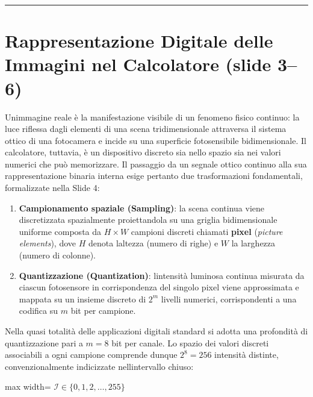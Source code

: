 \documentclass[11pt,a4paper,oneside,openany]{book}
\providecommand{\tightlist}{\setlength{\itemsep}{0pt}\setlength{\parskip}{0pt}}
\begin{document}
\begin{center}\rule{0.5\linewidth}{0.5pt}\end{center}

\section{Rappresentazione Digitale delle Immagini nel Calcolatore (slide 3--6)}\label{f02-r47}

Un\textquotesingle immagine reale è la manifestazione visibile di un fenomeno fisico continuo: la luce riflessa dagli elementi di una scena tridimensionale attraversa il sistema ottico di una fotocamera e incide su una superficie fotosensibile bidimensionale. Il calcolatore, tuttavia, è un dispositivo discreto sia nello spazio sia nei valori numerici che può memorizzare. Il passaggio da un segnale ottico continuo alla sua rappresentazione binaria interna esige pertanto due trasformazioni fondamentali, formalizzate nella Slide 4:

\begin{enumerate}
\def\labelenumi{\arabic{enumi}.}
\tightlist
\item
  \textbf{Campionamento spaziale (Sampling)}: la scena continua viene discretizzata spazialmente proiettandola su una griglia bidimensionale uniforme composta da \(H \times W\) campioni discreti chiamati \textbf{pixel} (\emph{picture elements}), dove \(H\) denota l\textquotesingle altezza (numero di righe) e \(W\) la larghezza (numero di colonne).
\item
  \textbf{Quantizzazione (Quantization)}: l\textquotesingle intensità luminosa continua misurata da ciascun fotosensore in corrispondenza del singolo pixel viene approssimata e mappata su un insieme discreto di \(2^m\) livelli numerici, corrispondenti a una codifica su \(m\) bit per campione.
\end{enumerate}

Nella quasi totalità delle applicazioni digitali standard si adotta una profondità di quantizzazione pari a \(m = 8\) bit per canale. Lo spazio dei valori discreti associabili a ogni campione comprende dunque \(2^8 = 256\) intensità distinte, convenzionalmente indicizzate nell\textquotesingle intervallo chiuso:

\begin{center}
\begin{adjustbox}{max width=\linewidth}
$\displaystyle 
\mathcal{I} \in \{0, 1, 2, \dots, 255\}
$
\end{adjustbox}
\end{center}
\end{document}
